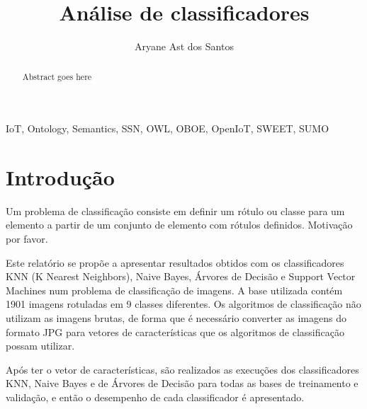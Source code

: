 \documentclass[conference]{IEEEtran}
\begin{document}
\title{Análise de classificadores}
\author{Aryane Ast dos Santos}



\author
{
}

\maketitle



\begin{abstract}
Abstract goes here

\end{abstract}


\begin {IEEEkeywords}
IoT, Ontology, Semantics,  SSN, OWL, OBOE, OpenIoT, SWEET, SUMO
\end{IEEEkeywords}


\section{Introdução}

Um problema de classificação consiste em definir um rótulo ou classe para um
elemento a partir de um conjunto de elemento com rótulos definidos. Motivação
por favor.

Este relatório se propõe a apresentar resultados obtidos com os classificadores
KNN (K Nearest Neighbors), Naive Bayes, Árvores de Decisão e Support Vector
Machines num problema de classificação de imagens. A base utilizada contém 1901
imagens rotuladas em 9 classes diferentes. Os algoritmos de classificação não
utilizam as imagens brutas, de forma que é necessário converter as imagens do
formato JPG para vetores de características que os algoritmos de classificação
possam utilizar.




Após ter o vetor de características, são realizados as execuções dos
classificadores KNN, Naive Bayes e de Árvores de Decisão para todas as bases
de treinamento e validação, e então o desempenho de cada classificador é
apresentado.
\end{document}
